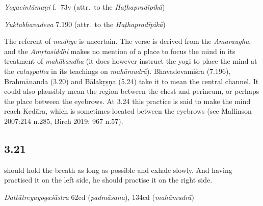 \begin{ekdosis}
\begin{testimonia}[hp03_020]
\emph{Yogacintāmaṇi} f.~73v (attr.~to the \emph{Haṭhapradīpikā})
\begin{versinnote}
\end{versinnote}

\emph{Yuktabhavadeva} 7.190 (attr.~to the \emph{Haṭhapradīpikā})
\begin{versinnote}
\end{versinnote}
\end{testimonia}

\begin{philcomm}[hp03_020]
The referent of \emph{madhye} is uncertain. The verse is derived from the \emph{Amaraugha}, and the \emph{Amṛtasiddhi} makes no mention of a place to focus the mind in its treatment of \emph{mahābandha} (it does however instruct the yogi to place the mind at the \emph{catuṣpatha} in its teachings on \emph{mahāmudrā}). Bhavadevamiśra (7.196), Brahmānanda (3.20) and Bālakṛṣṇa (5.24) take it to mean the central channel. It could also plausibly mean the region between the chest and perineum, or perhaps the place between the eyebrows. At 3.24 this practice is said to make the mind reach Kedāra, which is sometimes located between the eyebrows (see Mallinson 2007:214 n.285, Birch 2019: 967 n.57).
\end{philcomm}

\subsection*{3.21}
\begin{translation} should hold the breath as long as possible and exhale slowly. And having practised it on the left side, he should practise it on the right side. 
\end{translation}

\begin{sources}[hp03_021]
\emph{Dattātreyayogaśāstra} 62cd (\emph{padmāsana}), 134cd (\emph{mahāmudrā})
\begin{versinnote}
\end{versinnote}
\end{sources}


\end{ekdosis}
